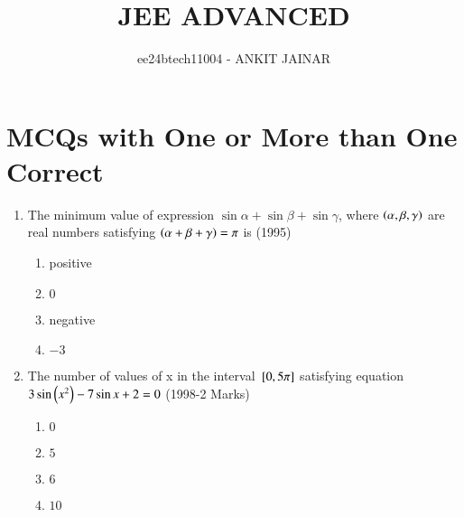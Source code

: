 \documentclass[journal,12pt,onecolumn]{IEEEtran}
\theoremstyle{remark}
\begin{document}

\vspace{3cm}

\title{JEE ADVANCED}
\author{ee24btech11004 - ANKIT JAINAR}
\maketitle

\bigskip

\renewcommand{\thefigure}{\theenumi}
\renewcommand{\thetable}{\theenumi}
\section{MCQs with One or More than One Correct}
\begin{enumerate}
\item The minimum value of expression $\sin{\alpha} + \sin{\beta} + \sin{\gamma}$, where $\left(\alpha,\beta,\gamma\right)$ are real numbers satisfying $\left(\alpha+\beta+\gamma\right)=\pi$  is \hfill(1995)
\begin{enumerate}
    \item positive
    \item $0$
    \item negative 
    \item $-3$
\end{enumerate}
\item The number of values of x in the interval ${}\left[0,5\pi\right]$ satisfying equation $3 \sin{\ensuremath{\left(x^2\right)}}-7 \sin{x+2}=0$ \hfill(1998-2 Marks) 
\begin{enumerate}
    \item $0$
    \item $5$
    \item $6$
    \item $10$
\end{enumerate}


\end{enumerate}
\end{document}
